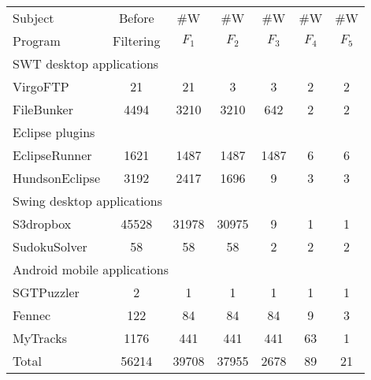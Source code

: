 \begin{table}[t]
\begin{center}
 \fontsize{9pt}{\baselineskip}\selectfont
\setlength{\tabcolsep}{.81\tabcolsep}
\hspace*{-0.2cm}
\begin{tabular}{|l||c|c|c|c|c|c|}
\hline
 Subject & Before & \#W & \#W & \#W & \#W& \#W \\
 Program & Filtering & $F_1$ & $F_2$ & $F_3$&$F_4$ & $F_5$\\
\hline \hline
\multicolumn{7}{|l|}{SWT desktop applications}   \\
 \hline
 VirgoFTP &  21 &  21 &  3 & 3 &  2 & 2\\
 \hline
 FileBunker &  4494 &  3210 &  3210 &  642 &  2 & 2\\
 \hline
 \hline
\multicolumn{7}{|l|}{Eclipse plugins}   \\
 \hline
 EclipseRunner&  1621 &  1487 &  1487 & 1487 &  6 & 6\\
 \hline
 HundsonEclipse&  3192 &  2417 &  1696 & 9 &  3 & 3\\
 \hline
 \hline
\multicolumn{7}{|l|}{Swing desktop applications}   \\
 \hline
 S3dropbox&  45528 &  31978 &  30975 & 9 &  1 & 1\\
 \hline
 SudokuSolver &  58 &  58 &  58 & 2 &  2 & 2\\
 \hline
 \hline
\multicolumn{7}{|l|}{Android mobile applications}   \\
 \hline
 SGTPuzzler&  2 &  1 &  1 & 1 &  1 & 1\\
 \hline
 Fennec &  122 &  84 & 84 & 84 &  9 & 3\\
 \hline
 MyTracks &  1176 &  441 &  441 & 441 &  63 & 1 \\
\hline
 \hline
 Total &  56214 &  39708 &  37955 &  2678 &  89 & 21 \\
 \hline
\end{tabular}
\end{center}
\vspace{-15pt}
\end{table}


